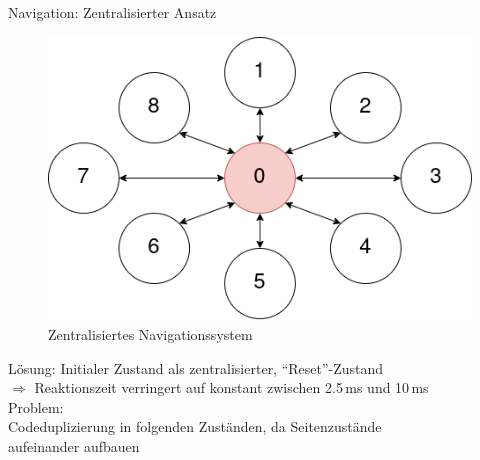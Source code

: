 \documentclass{beamer}
\begin{document}
\begin{frame}{Navigation: Zentralisierter Ansatz}
\begin{figure}
\center
\begin{minipage}{.5\textwidth}
\includegraphics[width=\textwidth]{figures/navigationsystem-central-overview.png}
\end{minipage}
\caption{Zentralisiertes Navigationssystem}
\end{figure}
Lösung: Initialer Zustand als zentralisierter, ``Reset''-Zustand\\
$\Rightarrow$ Reaktionszeit verringert auf konstant zwischen 2.5\,ms und 10\,ms \vspace{0.5em}\\
Problem: \\
\hspace{1em}Codeduplizierung in folgenden Zuständen, da Seitenzustände\\
\hspace{1em}aufeinander aufbauen
\end{frame}
\end{document}
